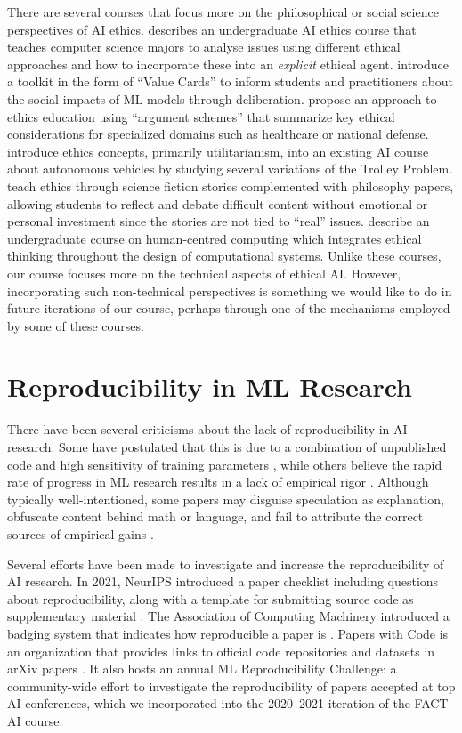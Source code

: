 There are several courses that focus more on the philosophical or social science perspectives of AI ethics.
\citet{green2021aiethics} describes an undergraduate AI ethics course that teaches computer science majors to analyse issues using different ethical approaches and how to incorporate these into an \textit{explicit} ethical agent. 
\citet{shenvalue2021} introduce a toolkit in the form of ``Value Cards'' to inform students and practitioners about the social impacts of ML models through deliberation.
\citet{green2020argument} propose an approach to ethics education using ``argument schemes'' that summarize key ethical considerations for specialized domains such as healthcare or national defense.
\citet{Furey2018IntroducingET} introduce ethics concepts, primarily utilitarianism, into an existing AI course about autonomous vehicles by studying several variations of the Trolley Problem.  
\citet{burton2018} teach ethics through science fiction stories complemented with philosophy papers, allowing students to reflect and debate difficult content without emotional or personal investment since the stories are not tied to ``real'' issues. 
\citet{skirpan2018ethics} describe an undergraduate course on human-centred computing which integrates ethical thinking throughout the design of computational systems. 
Unlike these courses, our course focuses more on the technical aspects of ethical AI.  
However, incorporating such non-technical perspectives is something we would like to do in future iterations of our course, perhaps through one of the mechanisms employed by some of these courses. 

\section{Reproducibility in ML Research}
\label{section:reproducibility}

There have been several criticisms about the lack of reproducibility in AI research. 
Some have postulated that this is due to a combination of unpublished code and high sensitivity of training parameters \citep{hutson2018artificial}, while others believe the rapid rate of progress in ML research results in a lack of empirical rigor \citep{sculley2018winner}. 
Although typically well-intentioned, some papers may disguise speculation as explanation, obfuscate content behind math or language, and fail to attribute the correct sources of empirical gains \citep{lipton2019research}. 

Several efforts have been made to investigate and increase the reproducibility of AI research. 
In 2021, NeurIPS introduced a paper checklist including questions about reproducibility, along with a template for submitting source code as supplementary material \citep{neuripschecklist}. 
The Association of Computing Machinery introduced a badging system that indicates how reproducible a paper is \citep{acm-artifact}. 
Papers with Code is an organization that provides links to official code repositories and datasets in arXiv papers \citep{paperswithcode2020}. 
It also hosts an annual ML Reproducibility Challenge: a community-wide effort to investigate the reproducibility of papers accepted at top AI conferences, which we incorporated into the 2020--2021 iteration of the FACT-AI course. 

